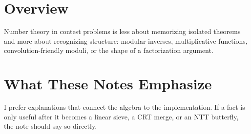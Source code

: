 \section*{Overview}

Number theory in contest problems is less about memorizing isolated theorems and more about recognizing structure:
modular inverses, multiplicative functions, convolution-friendly moduli, or the shape of a factorization argument.

\section*{What These Notes Emphasize}

I prefer explanations that connect the algebra to the implementation. If a fact is only useful after it becomes a
linear sieve, a CRT merge, or an NTT butterfly, the note should say so directly.
